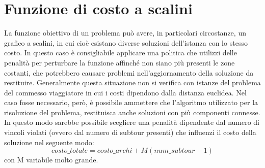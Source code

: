 \section{Funzione di costo a scalini}
La funzione obiettivo di un problema può avere, in particolari circostanze, un grafico a scalini, in cui cioè esistano diverse soluzioni dell'istanza con lo stesso costo. In questo caso è consigliabile applicare una politica che utilizzi delle penalità per perturbare la funzione affinché non siano più presenti le zone costanti, che potrebbero causare problemi nell'aggiornamento della soluzione da restituire. Generalmente questa situazione non si verifica con istanze del problema del commesso viaggiatore in cui i costi dipendono dalla distanza euclidea. Nel caso fosse necessario, però, è possibile ammettere che l'algoritmo utilizzato per la risoluzione del problema, restituisca anche soluzioni con più componenti connesse. In questo modo sarebbe possibile scegliere una penalità dipendente dal numero di vincoli violati (ovvero dal numero di subtour presenti) che influenzi il costo della soluzione nel seguente modo:
$$costo\_totale = costo\_archi + M (num\_subtour -1)$$
con M variabile molto grande.